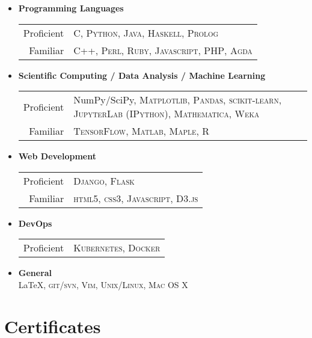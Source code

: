 \documentclass[a4paper,10pt]{article} %
\begin{document}
\begin{itemize}
  \item \textbf{Programming Languages} \\
        \begin{tabular}{rl}
          Proficient & \textsc{C}, \textsc{Python}, \textsc{Java}, \textsc{Haskell}, \textsc{Prolog}\\
          Familiar   & \textsc{C++}, \textsc{Perl}, \textsc{Ruby}, \textsc{Javascript}, \textsc{PHP}, \textsc{Agda}
        \end{tabular}
  \item \textbf{Scientific Computing / Data Analysis / Machine Learning} \\
        \begin{tabular}{rp{11cm}}
          Proficient & NumPy/SciPy, \textsc{Matplotlib}, \textsc{Pandas}, \textsc{scikit-learn}, \textsc{JupyterLab (IPython)}, \textsc{Mathematica}, \textsc{Weka} \\
          Familiar   & \textsc{TensorFlow}, \textsc{Matlab}, \textsc{Maple}, \textsc{R}
        \end{tabular}
  \item \textbf{Web Development} \\
        \begin{tabular}{rl}
          Proficient & \textsc{Django}, \textsc{Flask} \\
          Familiar   & \textsc{html5}, \textsc{css3}, \textsc{Javascript}, \textsc{D3.js}
        \end{tabular}
  \item \textbf{DevOps} \\
        \begin{tabular}{rl}
          Proficient & \textsc{Kubernetes}, \textsc{Docker} \\
        \end{tabular}
  \item \textbf{General} \\
        \fb \LaTeX, \textsc{git}/\textsc{svn}, \textsc{Vim}, \textsc{Unix/Linux}, \textsc{Mac OS X}
\end{itemize}


\section{Certificates}
\end{document}

